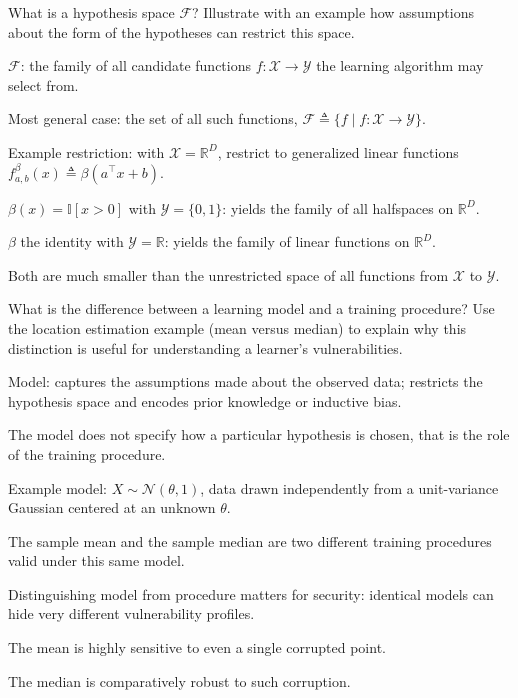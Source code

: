 \documentclass[10pt]{extarticle}
\newcommand{\resposta}[1]{\par\smallskip\noindent #1}
\begin{document}
\begin{questoes}
\item What is a hypothesis space $\mathcal{F}$? Illustrate with an example how assumptions about the form of the hypotheses can restrict this space.

\resposta{
\begin{topicos}
\item $\mathcal{F}$: the family of all candidate functions $f: \mathcal{X} \to \mathcal{Y}$ the learning algorithm may select from.
\item Most general case: the set of all such functions, $\mathcal{F} \triangleq \{f \mid f: \mathcal{X} \to \mathcal{Y}\}$.
\item Example restriction: with $\mathcal{X} = \mathbb{R}^D$, restrict to generalized linear functions $f^{\beta}_{a,b}(x) \triangleq \beta(a^\top x + b)$.
\item $\beta(x) = \mathbb{I}[x > 0]$ with $\mathcal{Y} = \{0,1\}$: yields the family of all halfspaces on $\mathbb{R}^D$.
\item $\beta$ the identity with $\mathcal{Y} = \mathbb{R}$: yields the family of linear functions on $\mathbb{R}^D$.
\item Both are much smaller than the unrestricted space of all functions from $\mathcal{X}$ to $\mathcal{Y}$.
\end{topicos}
}

\item What is the difference between a learning model and a training procedure? Use the location estimation example (mean versus median) to explain why this distinction is useful for understanding a learner's vulnerabilities.

\resposta{
\begin{topicos}
\item Model: captures the assumptions made about the observed data; restricts the hypothesis space and encodes prior knowledge or inductive bias.
\item The model does not specify how a particular hypothesis is chosen, that is the role of the training procedure.
\item Example model: $X \sim \mathcal{N}(\theta, 1)$, data drawn independently from a unit-variance Gaussian centered at an unknown $\theta$.
\item The sample mean and the sample median are two different training procedures valid under this same model.
\item Distinguishing model from procedure matters for security: identical models can hide very different vulnerability profiles.
\item The mean is highly sensitive to even a single corrupted point.
\item The median is comparatively robust to such corruption.
\end{topicos}
}


\end{questoes}
\end{document}
